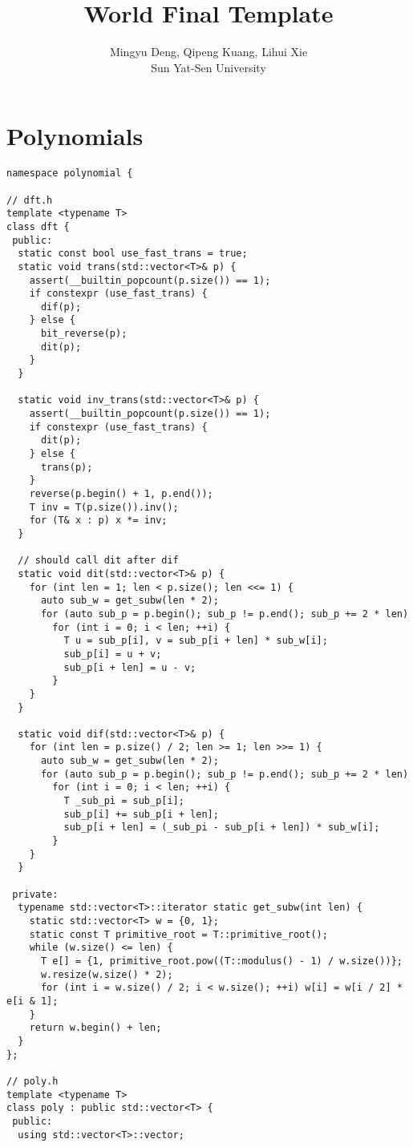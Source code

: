 \documentclass{article}
\title{World Final Template}
\author{Mingyu Deng, Qipeng Kuang, Lihui Xie \\ Sun Yat-Sen University}
\date{}
\begin{document}
\maketitle

\section{Polynomials}

\begin{lstlisting}
namespace polynomial {

// dft.h
template <typename T>
class dft {
 public:
  static const bool use_fast_trans = true;
  static void trans(std::vector<T>& p) {
    assert(__builtin_popcount(p.size()) == 1);
    if constexpr (use_fast_trans) {
      dif(p);
    } else {
      bit_reverse(p);
      dit(p);
    }
  }

  static void inv_trans(std::vector<T>& p) {
    assert(__builtin_popcount(p.size()) == 1);
    if constexpr (use_fast_trans) {
      dit(p);
    } else {
      trans(p);
    }
    reverse(p.begin() + 1, p.end());
    T inv = T(p.size()).inv();
    for (T& x : p) x *= inv;
  }

  // should call dit after dif
  static void dit(std::vector<T>& p) {
    for (int len = 1; len < p.size(); len <<= 1) {
      auto sub_w = get_subw(len * 2);
      for (auto sub_p = p.begin(); sub_p != p.end(); sub_p += 2 * len)
        for (int i = 0; i < len; ++i) {
          T u = sub_p[i], v = sub_p[i + len] * sub_w[i];
          sub_p[i] = u + v;
          sub_p[i + len] = u - v;
        }
    }
  }

  static void dif(std::vector<T>& p) {
    for (int len = p.size() / 2; len >= 1; len >>= 1) {
      auto sub_w = get_subw(len * 2);
      for (auto sub_p = p.begin(); sub_p != p.end(); sub_p += 2 * len)
        for (int i = 0; i < len; ++i) {
          T _sub_pi = sub_p[i];
          sub_p[i] += sub_p[i + len];
          sub_p[i + len] = (_sub_pi - sub_p[i + len]) * sub_w[i];
        }
    }
  }

 private:
  typename std::vector<T>::iterator static get_subw(int len) {
    static std::vector<T> w = {0, 1};
    static const T primitive_root = T::primitive_root();
    while (w.size() <= len) {
      T e[] = {1, primitive_root.pow((T::modulus() - 1) / w.size())};
      w.resize(w.size() * 2);
      for (int i = w.size() / 2; i < w.size(); ++i) w[i] = w[i / 2] * e[i & 1];
    }
    return w.begin() + len;
  }
};

// poly.h
template <typename T>
class poly : public std::vector<T> {
 public:
  using std::vector<T>::vector;


\end{lstlisting}
\end{document}
